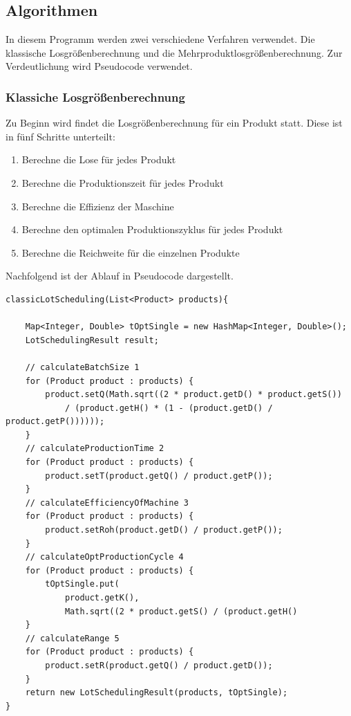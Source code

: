 \documentclass[12pt,a4paper, listof=entryprefix, bibliography=totocnumbered,toc=listofnumbered,lof=listofnumbered]{scrartcl}
\begin{document}
\subsection{Algorithmen}
In diesem Programm werden zwei verschiedene Verfahren verwendet. Die klassische Losgrößenberechnung und die Mehrproduktlosgrößenberechnung. Zur Verdeutlichung wird Pseudocode verwendet.
\subsubsection{Klassiche Losgrößenberechnung}
Zu Beginn wird findet die Losgrößenberechnung für ein Produkt statt. Diese ist in fünf Schritte unterteilt:
\begin{enumerate}
	\item Berechne die Lose für jedes Produkt
	\item Berechne die Produktionszeit für jedes Produkt
	\item Berechne die Effizienz der Maschine
	\item Berechne den optimalen Produktionszyklus für jedes Produkt
	\item Berechne die Reichweite für die einzelnen Produkte
\end{enumerate}
Nachfolgend ist der Ablauf in Pseudocode dargestellt.
\begin{lstlisting}[caption= Beispielprogramm, label=lst:code]
classicLotScheduling(List<Product> products){

    Map<Integer, Double> tOptSingle = new HashMap<Integer, Double>();
    LotSchedulingResult result;

	// calculateBatchSize 1
	for (Product product : products) {
	    product.setQ(Math.sqrt((2 * product.getD() * product.getS())
		    / (product.getH() * (1 - (product.getD() / product.getP())))));
	}
	// calculateProductionTime 2
	for (Product product : products) {
	    product.setT(product.getQ() / product.getP());
	}
	// calculateEfficiencyOfMachine 3
	for (Product product : products) {
	    product.setRoh(product.getD() / product.getP());
	}
	// calculateOptProductionCycle 4
	for (Product product : products) {
	    tOptSingle.put(
		    product.getK(),
		    Math.sqrt((2 * product.getS() / (product.getH()
	}
	// calculateRange 5
	for (Product product : products) {
	    product.setR(product.getQ() / product.getD());
	}
	return new LotSchedulingResult(products, tOptSingle);
}
\end{lstlisting}
\end{document}
